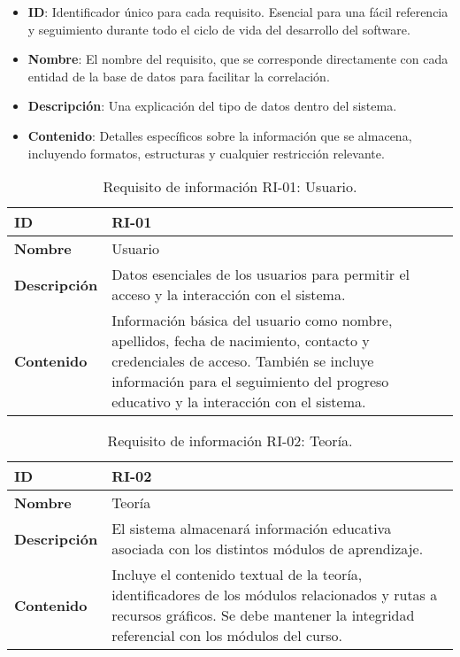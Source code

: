 \begin{itemize}
    \item \textbf{ID}: Identificador único para cada requisito. Esencial para una fácil referencia y seguimiento durante todo el ciclo de vida del desarrollo del software.
    \item \textbf{Nombre}: El nombre del requisito, que se corresponde directamente con cada entidad de la base de datos para facilitar la correlación.
    \item \textbf{Descripción}: Una explicación del tipo de datos dentro del sistema.
    \item \textbf{Contenido}: Detalles específicos sobre la información que se almacena, incluyendo formatos, estructuras y cualquier restricción relevante.
\end{itemize}

\begin{table}[H]
    \centering
    \begin{tabular}{|l|p{9.5cm}|}
        \hline
        \textbf{ID} & RI-01 \\
        \hline
        \textbf{Nombre} & Usuario \\
        \hline
        \textbf{Descripción} & Datos esenciales de los usuarios para permitir el acceso y la interacción con el sistema. \\
        \hline
        \textbf{Contenido} & Información básica del usuario como nombre, apellidos, fecha de nacimiento, contacto y credenciales de acceso. También se incluye información para el seguimiento del progreso educativo y la interacción con el sistema. \\
        \hline
    \end{tabular}
    \caption{Requisito de información RI-01: Usuario.}
    \label{table:req-RI01}
\end{table}

\begin{table}[H]
    \centering
    \begin{tabular}{|l|p{9.5cm}|}
        \hline
        \textbf{ID} & RI-02 \\
        \hline
        \textbf{Nombre} & Teoría \\
        \hline
        \textbf{Descripción} &  El sistema almacenará información educativa asociada con los distintos módulos de aprendizaje. \\
        \hline
        \textbf{Contenido} & Incluye el contenido textual de la teoría, identificadores de los módulos relacionados y rutas a recursos gráficos. Se debe mantener la integridad referencial con los módulos del curso.  \\
        \hline
    \end{tabular}
    \caption{Requisito de información RI-02: Teoría.}
    \label{table:req-RI04}
\end{table}

